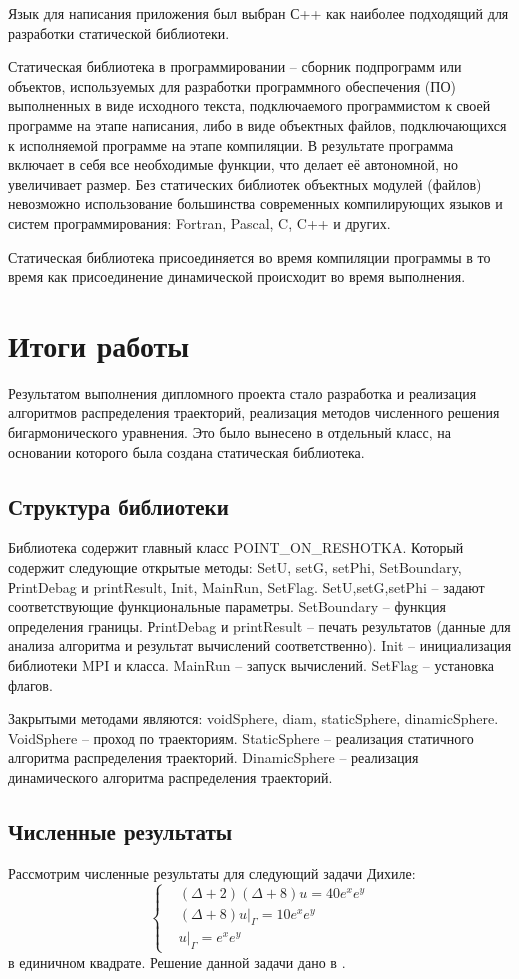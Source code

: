 Язык для написания приложения был выбран С++ как наиболее подходящий для разработки статической библиотеки.

Статическая библиотека в программировании -- сборник подпрограмм или объектов, используемых для разработки программного обеспечения (ПО) выполненных в виде исходного текста, подключаемого программистом к своей программе на этапе написания, либо в виде объектных файлов, подключающихся к исполняемой программе на этапе компиляции. В результате программа включает в себя все необходимые функции, что делает её автономной, но увеличивает размер. Без статических библиотек объектных модулей (файлов) невозможно использование большинства современных компилирующих языков и систем программирования: Fortran, Pascal, C, C++ и других.

Статическая библиотека присоединяется во время компиляции программы в то время как присоединение динамической происходит во время выполнения.

\chapter{Итоги работы}
Результатом выполнения дипломного проекта стало разработка и реализация алгоритмов распределения траекторий, реализация методов численного решения бигармонического уравнения. Это было вынесено в отдельный класс, на основании которого была создана статическая библиотека.  
\section{Структура библиотеки}
Библиотека содержит главный класс POINT\_ON\_RESHOTKA.
Который содержит следующие открытые методы: SetU, setG, setPhi, SetBoundary, РrintDebag и printResult, Init, MainRun, SetFlag.
SetU,setG,setPhi -- задают соответствующие функциональные параметры.
SetBoundary -- функция определения границы.
РrintDebag и printResult -- печать результатов (данные для анализа алгоритма и результат вычислений соответственно).
Init -- инициализация библиотеки MPI и класса.
MainRun -- запуск вычислений.
SetFlag -- установка флагов.

Закрытыми методами являются: voidSphere, diam, staticSphere, dinamicSphere.
VoidSphere -- проход по траекториям.
StaticSphere -- реализация статичного алгоритма распределения траекторий.
DinamicSphere -- реализация динамического алгоритма распределения траекторий.

\section{Численные результаты}
Рассмотрим численные результаты для следующий задачи Дихиле:
\begin{equation} 
	\left\{
\begin{aligned}
& (\Delta + 2) (\Delta +8) u = 40e^{x}e^{y}\\ & (\Delta +8) u|_{\Gamma} = 10e^{x}e^{y}\\&u|_{\Gamma} = e^{x}e^{y}
\end{aligned}
 \right. \end{equation}
{}
в единичном квадрате. Решение данной задачи дано в \cite{luk:dis}.

